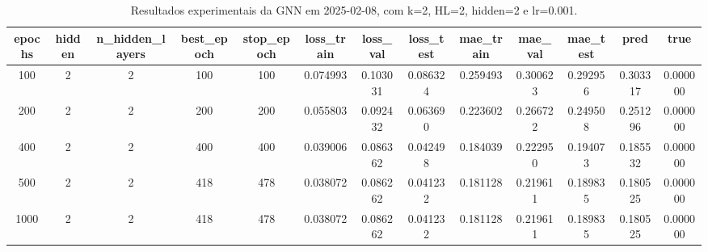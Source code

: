 \begin{table}[h]
\centering
\caption{Resultados experimentais da GNN em 2025-02-08, com k=2, HL=2, hidden=2 e lr=0.001.}
\label{tab:gnn_results_k2_hl2_h2_d20250208}
\begin{tabular}{ccccccccccccc}
\toprule
epochs & hidden & n\_hidden\_layers & best\_epoch & stop\_epoch & loss\_train & loss\_val & loss\_test & mae\_train & mae\_val & mae\_test & pred & true \\
\midrule
100 & 2 & 2 & 100 & 100 & 0.074993 & 0.103031 & 0.086324 & 0.259493 & 0.300623 & 0.292956 & 0.303317 & 0.000000 \\
200 & 2 & 2 & 200 & 200 & 0.055803 & 0.092432 & 0.063690 & 0.223602 & 0.266722 & 0.249508 & 0.251296 & 0.000000 \\
400 & 2 & 2 & 400 & 400 & 0.039006 & 0.086362 & 0.042498 & 0.184039 & 0.222950 & 0.194073 & 0.185532 & 0.000000 \\
500 & 2 & 2 & 418 & 478 & 0.038072 & 0.086262 & 0.041232 & 0.181128 & 0.219611 & 0.189835 & 0.180525 & 0.000000 \\
1000 & 2 & 2 & 418 & 478 & 0.038072 & 0.086262 & 0.041232 & 0.181128 & 0.219611 & 0.189835 & 0.180525 & 0.000000 \\
\bottomrule
\end{tabular}
\end{table}
